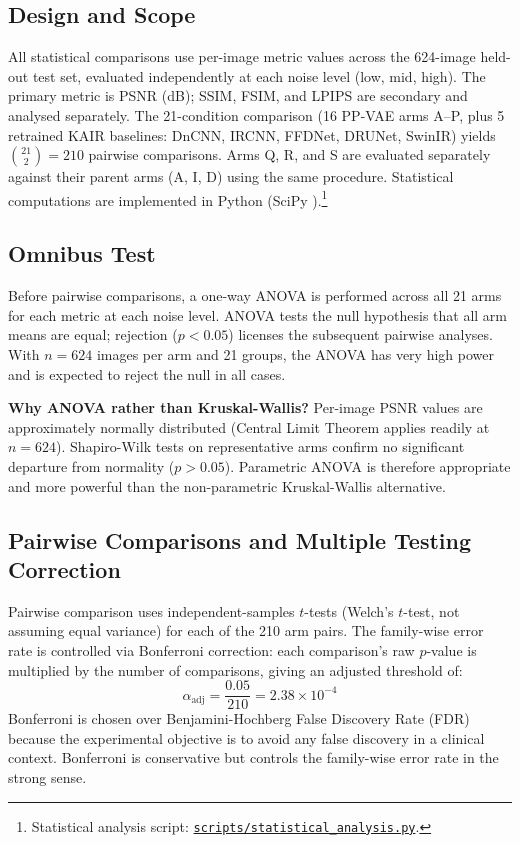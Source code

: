 \documentclass[12pt, a4paper, twoside, openright]{book}
\begin{document}
\subsection{Design and Scope}

All statistical comparisons use per-image metric values across the 624-image held-out test set, evaluated independently at each noise level (low, mid, high). The primary metric is PSNR (dB); SSIM, FSIM, and LPIPS are secondary and analysed separately. The 21-condition comparison (16 PP-VAE arms A--P, plus 5 retrained KAIR baselines: DnCNN, IRCNN, FFDNet, DRUNet, SwinIR) yields $\binom{21}{2} = 210$ pairwise comparisons. Arms Q, R, and S are evaluated separately against their parent arms (A, I, D) using the same procedure. Statistical computations are implemented in Python (SciPy \cite{virtanen_scipy_2020}).\footnote{Statistical analysis script: \href{https://github.com/teklesam/ppva_hformer_codebase/blob/main/scripts/statistical_analysis.py}{\texttt{scripts/statistical\_analysis.py}}.}

\subsection{Omnibus Test}

Before pairwise comparisons, a one-way ANOVA is performed across all 21 arms for each metric at each noise level. ANOVA tests the null hypothesis that all arm means are equal; rejection ($p < 0.05$) licenses the subsequent pairwise analyses. With $n=624$ images per arm and 21 groups, the ANOVA has very high power and is expected to reject the null in all cases.

\textbf{Why ANOVA rather than Kruskal-Wallis?} Per-image PSNR values are approximately normally distributed (Central Limit Theorem applies readily at $n=624$). Shapiro-Wilk tests on representative arms confirm no significant departure from normality ($p > 0.05$). Parametric ANOVA is therefore appropriate and more powerful than the non-parametric Kruskal-Wallis alternative.

\subsection{Pairwise Comparisons and Multiple Testing Correction}

Pairwise comparison uses independent-samples $t$-tests (Welch's $t$-test, not assuming equal variance) for each of the 210 arm pairs. The family-wise error rate is controlled via Bonferroni correction: each comparison's raw $p$-value is multiplied by the number of comparisons, giving an adjusted threshold of:
\begin{equation}
\alpha_{\mathrm{adj}} = \frac{0.05}{210} = 2.38 \times 10^{-4}
\end{equation}
Bonferroni is chosen over Benjamini-Hochberg False Discovery Rate (FDR) because the experimental objective is to avoid any false discovery in a clinical context. Bonferroni is conservative but controls the family-wise error rate in the strong sense.
\end{document}
